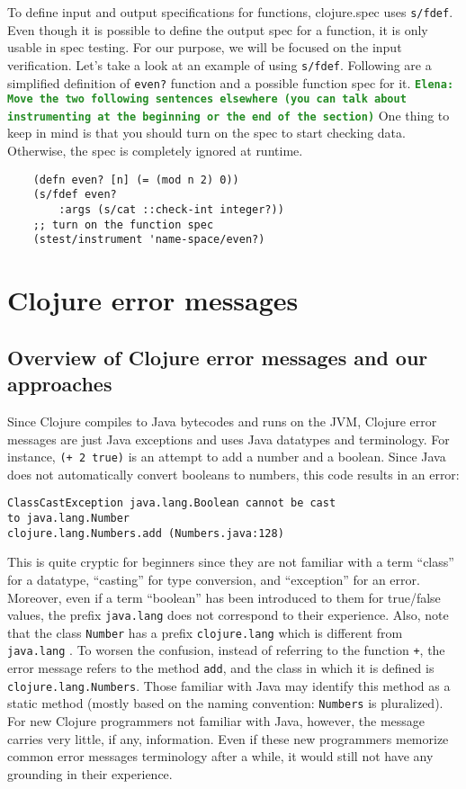 \documentclass[12pt]{article}
\newcommand{\comment}[1]{{\bf \tt  {#1}}}
\newcommand{\emcomment}[1]{\textcolor{ForestGreen}{\comment{Elena: {#1}}}}
\begin{document}
	To define 
	input and output specifications for functions, clojure.spec uses \texttt{s/fdef}. Even though it is possible to define the output spec 
	for a function, it is only usable in spec testing. For our purpose, we will be focused on the input verification. Let's take a 
	look at an example of using \texttt{s/fdef}. Following are a simplified definition of \texttt{even?} function and a possible function spec for it. 
	\emcomment{Move the two following sentences elsewhere (you can talk about instrumenting at the beginning or the end of the section)}
	One thing to keep in mind is that you should turn on the spec to start checking data. Otherwise, the spec is completely 
	ignored at runtime.
	\begin{verbatim}
	(defn even? [n] (= (mod n 2) 0))
	(s/fdef even?
    	:args (s/cat ::check-int integer?))
	;; turn on the function spec
	(stest/instrument 'name-space/even?)
	\end{verbatim}
	
	


\section{Clojure error messages}
\subsection{Overview of Clojure error messages and our approaches}
Since Clojure compiles to Java bytecodes and runs on the JVM, Clojure error messages are just Java exceptions
and uses Java datatypes and terminology. 
For instance, {\tt (+ 2 true)} is an attempt to add a number and a boolean. 
Since Java does not automatically convert booleans to numbers, this code results in an error:
\begin{verbatim}
ClassCastException java.lang.Boolean cannot be cast 
to java.lang.Number  
clojure.lang.Numbers.add (Numbers.java:128)
\end{verbatim} 
This is quite cryptic for beginners since they are not familiar with a term ``class'' for a datatype,
``casting'' for type conversion, and ``exception'' for an error. Moreover, even if a term ``boolean'' 
has been introduced to them for true/false values, the prefix {\tt  java.lang} does not 
correspond to their experience. Also, note that the class {\tt Number} has a prefix {\tt  clojure.lang}
which is different from {\tt  java.lang} . To worsen the confusion, instead of referring
to the function {\tt +}, the error message refers to the method {\tt add}, and the class 
in which it is defined is {\tt clojure.lang.Numbers}. Those familiar with Java may identify this
method as a static method (mostly based on the naming convention: {\tt Numbers} is pluralized). 
For new Clojure programmers not familiar with Java, however, the message carries very little, if any, information. 
Even if these new programmers memorize common error messages terminology after a while, 
it would still not have any grounding in their experience. 
\end{document}
